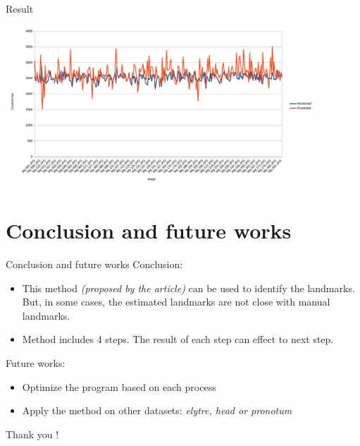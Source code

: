 \documentclass{beamer}
\begin{document}
\begin{frame}{Result}
	\begin{center}
		\includegraphics[height=6cm]{images/MgChart.png}	
	\end{center}
\end{frame}
\section{Conclusion and future works}
\begin{frame}{Conclusion and future works}
	Conclusion:
	\begin{itemize}
		\item This method \textit{(proposed by the article)} can be used to identify the landmarks. But, in some cases, the estimated landmarks are not close with manual landmarks.
		\item Method includes 4 steps. The result of each step can effect to next step.
	\end{itemize}
	Future works:
	\begin{itemize}
		\item Optimize the program based on each process
		\item Apply the method on other datasets: \textit{elytre, head or pronotum}
	\end{itemize}
\end{frame}
\begin{frame}[plain]
  \Huge{\centerline{Thank you !}}
\end{frame}
\end{document}
